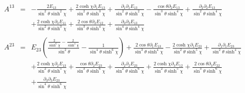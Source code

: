 \documentclass[10pt,letterpaper]{article}
\numberwithin{equation}{section}
\begin{document}
\begin{eqnarray}
\\  \nonumber\\ 
A^{13}&=& - \frac{2 E_{13}}{\sin^2\theta \sinh^2\chi} + \frac{2 \cosh\chi \partial_{1}E_{13}}{\sin^2\theta \sinh^3\chi} + \frac{\partial_{1}\partial_{1}E_{13}}{\sin^2\theta \sinh^2\chi} -  \frac{\cos\theta \partial_{2}E_{13}}{\sin^3\theta \sinh^4\chi} + \frac{\partial_{2}\partial_{2}E_{13}}{\sin^2\theta \sinh^4\chi} \nonumber \\ 
&& + \frac{2 \cosh\chi \partial_{3}E_{11}}{\sin^2\theta \sinh^3\chi} + \frac{2 \cos\theta \partial_{3}E_{12}}{\sin^3\theta \sinh^4\chi} + \frac{\partial_{3}\partial_{3}E_{13}}{\sin^4\theta \sinh^4\chi}
\\  \nonumber\\ 
A^{23}&=& E_{23} \left(\frac{\frac{2}{\sinh^6\chi} -  \frac{2}{\sinh^4\chi}}{\sin^2\theta} -  \frac{1}{\sin^4\theta \sinh^6\chi}\right) + \frac{2 \cos\theta \partial_{1}E_{13}}{\sin^3\theta \sinh^4\chi} -  \frac{2 \cosh\chi \partial_{1}E_{23}}{\sin^2\theta \sinh^5\chi} + \frac{\partial_{1}\partial_{1}E_{23}}{\sin^2\theta \sinh^4\chi} \nonumber \\ 
&& + \frac{2 \cosh\chi \partial_{2}E_{13}}{\sin^2\theta \sinh^5\chi} + \frac{\cos\theta \partial_{2}E_{23}}{\sin^3\theta \sinh^6\chi} + \frac{\partial_{2}\partial_{2}E_{23}}{\sin^2\theta \sinh^6\chi} + \frac{2 \cosh\chi \partial_{3}E_{12}}{\sin^2\theta \sinh^5\chi} + \frac{2 \cos\theta \partial_{3}E_{22}}{\sin^3\theta \sinh^6\chi} \nonumber \\ 
&& + \frac{\partial_{3}\partial_{3}E_{23}}{\sin^4\theta \sinh^6\chi}
\end{eqnarray}
%
%
\end{document}
